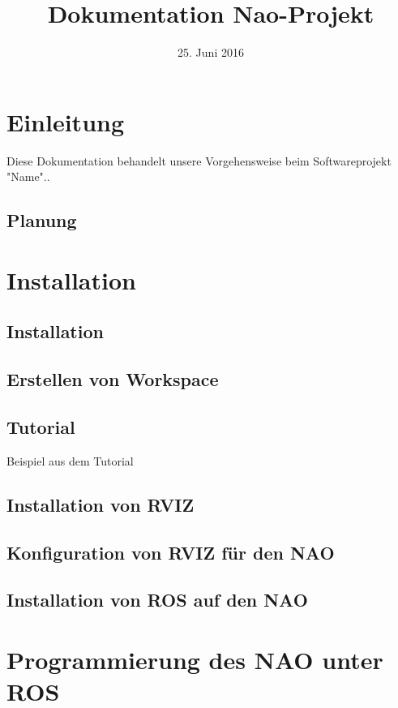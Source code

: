 \documentclass{scrartcl}
\title{Dokumentation Nao-Projekt}
\date{25. Juni 2016}
\begin{document}
\maketitle
\tableofcontents


\section{Einleitung}

Diese Dokumentation behandelt unsere Vorgehensweise beim Softwareprojekt "Name"..

\subsection{Planung}

\section{Installation}

\subsection{Installation}
\subsection{Erstellen von Workspace}
\subsection{Tutorial}
Beispiel aus dem Tutorial
\subsection{Installation von RVIZ}
\subsection{Konfiguration von RVIZ für den NAO}
\subsection{Installation von ROS auf den NAO}


\section{Programmierung des NAO unter ROS}
\end{document}
